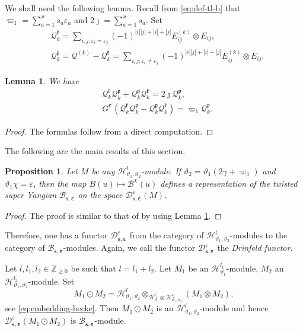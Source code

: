 \documentclass[11pt,reqno]{amsart}
\numberwithin{equation}{section}
\newtheorem{prop}[thm]{Proposition}
\newtheorem{lem}[thm]{Lemma}
\theoremstyle{definition}
\theoremstyle{remark}
\newcommand{\mc}{\mathcal}
\newcommand{\bZ}{\mathbb{Z}}
\newcommand{\gge}{\geqslant}
\newcommand{\BMN}{{\mathscr{B}_{\bm s,\bm \ve}}}
\newcommand{\ka}{\varkappa}
\newcommand{\ve}{\varepsilon}
\newcommand{\s}{{\bm s}}
\begin{document}
We shall need the following lemma. Recall from \eqref{eq:def-tl-b} that $\varpi_1=\sum_{a=1}^\ka s_a\ve_a$ and $2\jmath=\sum_{a=1}^\ka s_a$. Set
\begin{align*}
&\mathcal Q_k^{\mathfrak k}=\sum_{i,j:\ve_i=\ve_j}(-1)^{|i||j|+|i|+|j|}E_{ij}^{(k)}\otimes E_{ij},\\
&\mathcal Q_k^{\mathfrak p}=\mathcal Q^{(k)}-\mathcal Q_k^{\mathfrak k}=\sum_{i,j:\ve_i\ne\ve_j}(-1)^{|i||j|+|i|+|j|}E_{ij}^{(k)}\otimes E_{ij}.
\end{align*}
\begin{lem}\label{lem:cgm-thm4.5}
We have
\begin{align*}
&\mathcal Q_k^{\mathfrak k}\mathcal Q_k^{\mathfrak p}+\mathcal Q_k^{\mathfrak p}\mathcal Q_k^{\mathfrak k}=2\jmath \mathcal Q_k^{\mathfrak p},\\
&G^{\bm\ve}(\mathcal Q_k^{\mathfrak k}\mathcal Q_k^{\mathfrak p}-\mathcal Q_k^{\mathfrak p}\mathcal Q_k^{\mathfrak k})=\varpi_1 \mathcal Q_k^{\mathfrak p}.
\end{align*}
\end{lem}
\begin{proof}
The formulas follow from a direct computation.
\end{proof}

The following are the main results of this section.

\begin{prop}\label{prop:Drinfeld-functor-BC}
Let $M$ be any $\mathscr H_{\vartheta_1,\vartheta_2}^l$-module. If $\vartheta_2=\vartheta_1(2\gamma +\varpi_1)$ and $\vartheta_1\chi=\ve$, then the map $B(u)\mapsto \mc B^\chi(u)$ defines a representation of the twisted super Yangian $\BMN$ on the space $\mc D_{\s,\bm \ve}^{\ve}(M)$.
\end{prop}
\begin{proof}
The proof is similar to that of \cite[Theorem 4.5]{Chen2014twisted} by using Lemma \ref{lem:cgm-thm4.5}.
\end{proof}

Therefore, one has a functor $\mc D_{\s,\bm\ve}^\ve$ from the category of $\mathscr H_{\vartheta_1,\vartheta_2}^l$-modules to the category of $\BMN$-modules. Again, we call the functor $\mc D_{\s,\bm\ve}^\ve$ the {\it Drinfeld functor}.

Let $l,l_1,l_2\in\bZ_{\gge0}$ be such that $l=l_1+l_2$. Let $M_1$ be an $\mathscr H_{\vartheta_1}^{l_1}$-module, $M_2$ an $\mathscr H_{\vartheta_1,\vartheta_2}^{l_2}$-module. Set
\[
M_1\odot M_2 =\mathscr H_{\vartheta_1,\vartheta_2}^{l}\otimes_{\mathscr H_{\vartheta_1}^{l_1} \otimes \mathscr H_{\vartheta_1,\vartheta_2}^{l_2} }(M_1\otimes M_2),
\]
see \eqref{eq:embedding-hecke}. Then $M_1\odot M_2$ is an $\mathscr H_{\vartheta_1,\vartheta_2}^{l}$-module and hence $\mc D_{\s,\bm \ve}^\ve(M_1\odot M_2)$ is $\BMN$-module.
\end{document}

